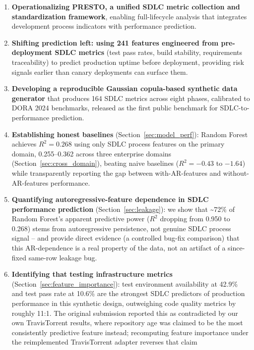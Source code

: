 \documentclass[technologies,article,submit,pdftex,moreauthors]{Definitions/mdpi}
\begin{document}
\begin{enumerate}
\def\labelenumi{\arabic{enumi}.}
\item
  \textbf{Operationalizing PRESTO, a unified SDLC metric collection and
  standardization framework}, enabling full-lifecycle analysis that
  integrates development process indicators with performance prediction.
\item
  \textbf{Shifting prediction left: using 241 features engineered from
  pre-deployment SDLC metrics} (test pass rates, build stability,
  requirements traceability) to predict production uptime before
  deployment, providing risk signals earlier than canary deployments can
  surface them.
\item
  \textbf{Developing a reproducible Gaussian copula-based synthetic data
  generator} that produces 164 SDLC metrics across eight phases,
  calibrated to DORA 2024 benchmarks, released as the first public
  benchmark for SDLC-to-performance prediction.
\item
  \textbf{Establishing honest baselines} (Section~\ref{sec:model_perf}): Random Forest
  achieves \(R^2 = 0.268\) using only SDLC process features on the
  primary domain, 0.255--0.362 across three enterprise domains (Section~\ref{sec:cross_domain}), beating naive baselines (\(R^2 = -0.43\) to \(-1.64\)) while
  transparently reporting the gap between with-AR-features and
  without-AR-features performance.
\item
  \textbf{Quantifying autoregressive-feature dependence in SDLC
  performance prediction} (Section~\ref{sec:leakage}): we show that
  \textasciitilde72\% of Random Forest's apparent predictive power
  (\(R^2\) dropping from 0.950 to 0.268) stems from autoregressive
  persistence, not genuine SDLC process signal -- and provide direct
  evidence (a controlled bug-fix comparison) that this AR-dependence is
  a real property of the data, not an artifact of a since-fixed same-row
  leakage bug.
\item
  \textbf{Identifying that testing infrastructure metrics} (Section~\ref{sec:feature_importance}): test environment availability at 42.9\% and test pass rate at
  10.6\% are the strongest SDLC predictors of production performance in
  this synthetic design, outweighing code quality metrics by roughly
  11:1. The original submission reported this as contradicted by our own
  TravisTorrent results, where repository age was claimed to be the most
  consistently predictive feature instead; recomputing feature
  importance under the reimplemented TravisTorrent adapter reverses that claim

\end{enumerate}
\end{document}
